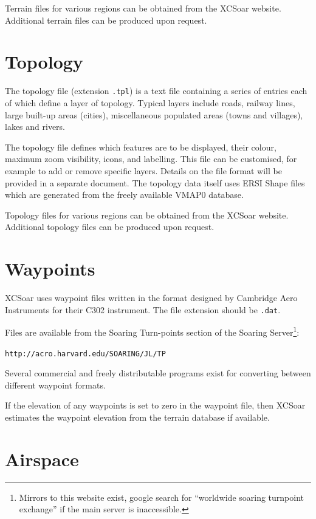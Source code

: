 \documentclass[a4paper,12pt]{refrep}
\begin{document}
Terrain files for various regions can be obtained from the XCSoar website.
Additional terrain files can be produced upon request.

\section{Topology}

The topology file (extension \verb|.tpl|) is a text file containing a
series of entries each of which define a layer of topology.  Typical
layers include roads, railway lines, large built-up areas (cities),
miscellaneous populated areas (towns and villages), lakes and rivers.

The topology file defines which features are to be displayed, their
colour, maximum zoom visibility, icons, and labelling.  This file can
be customised, for example to add or remove specific layers.  Details
on the file format will be provided in a separate document.  The
topology data itself uses ERSI Shape files which are generated from the
freely available VMAP0 database.

Topology files for various regions can be obtained from the XCSoar
website.  Additional topology files can be produced upon request.

\section{Waypoints}

XCSoar uses waypoint files written in the format designed by Cambridge
Aero Instruments for their C302 instrument.  The file extension should
be \verb|.dat|.

Files are available from the Soaring Turn-points section of the
Soaring Server\footnote{Mirrors to this website exist, google search
for ``worldwide soaring turnpoint exchange'' if the main server is
inaccessible.}:

\verb|http://acro.harvard.edu/SOARING/JL/TP|

Several commercial and freely distributable programs exist for
converting between different waypoint formats.

If the elevation of any waypoints is set to zero in the waypoint file,
then XCSoar estimates the waypoint elevation from the terrain database
if available.

\section{Airspace}
\end{document}
